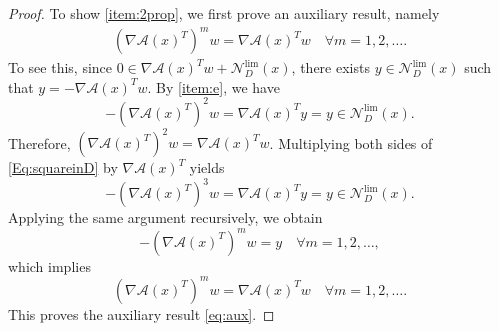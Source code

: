 \documentclass[11pt,a4paper,reqno]{amsart}
\begin{document}
{\begin{proof}
To show \ref{item:2prop}, we first prove an auxiliary result, namely
\begin{align}\label{eq:aux}
    \left(\nabla \mathcal A (x)^T\right)^m w =\nabla \mathcal A(x)^T w \quad \forall m = 1,2,\ldots.
\end{align}
    To see this, since $0\in \nabla \mathcal A(x)^Tw+ \mathcal N_D^{\text{lim}}(x)$, there exists $y\in \mathcal N_D^{\text{lim}}(x)$ such that $y=-\nabla \mathcal A(x)^Tw$. By  \ref{item:e}, we have
    \begin{equation}\label{Eq:squareinD}
    -\left(\nabla \mathcal A(x)^T\right)^2w=\nabla \mathcal A(x)^T y=y \in \mathcal N_D^{\text{lim}}(x).
    \end{equation}
    Therefore, $\left(\nabla \mathcal A(x)^T\right)^2w=\nabla \mathcal A(x)^Tw$. Multiplying both sides of \eqref{Eq:squareinD} by $\nabla \mathcal A(x)^T$ yields
    \begin{equation*}
    -\left(\nabla \mathcal A(x)^T\right)^3w=\nabla \mathcal A(x)^T y = y \in \mathcal N_D^{\text{lim}}(x).
    \end{equation*}
    Applying the same argument recursively, we obtain
\[
-\left(\nabla \mathcal A(x)^T\right)^m w = y
\quad \forall m = 1,2,\ldots,
\]
which implies
\[
\left(\nabla \mathcal A(x)^T\right)^m w
=
\nabla \mathcal A(x)^T w
\quad \forall m = 1,2,\ldots.
\]
This proves the auxiliary result \eqref{eq:aux}.


\end{proof}}
\end{document}

